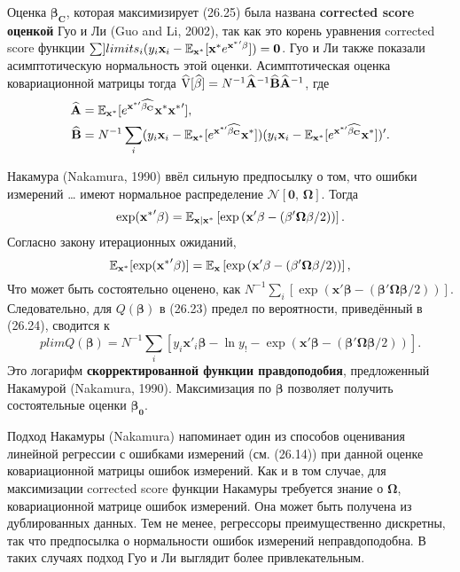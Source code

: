 Оценка $\mathbf{\beta_C}$, которая максимизирует (26.25) была названа {\bf corrected score оценкой} Гуо и Ли (Guo and Li, 2002), так как это корень уравнения corrected score функции $\sum ]limits_i (y_i \mathbf{x}_i- \mathbb{E}_{\mathbf{x^*}}[\mathbf{x^*}e^{\mathbf{x^*}'\mathbf{\beta}}])=\mathbf{0}$. Гуо и Ли также показали асимптотическую нормальность этой оценки. Асимптотическая оценка ковариационной матрицы тогда $\widehat{\mathrm{V}}[\widehat{\mathbf{\beta}}]=N^{-1} \widehat{\mathbf{A}}^{-1}\widehat{\mathbf{B}}\widehat{\mathbf{A}}^{-1}$, где 
\begin{align*}
\widehat{\mathbf{A}}&=\mathbb{E}_{\mathbf{x^*}}[e^{\mathbf{x}^{*\prime} \widehat{\mathbf{\beta_C}}} \mathbf{x^*} \mathbf{x^*}'], \\
\widehat{\mathbf{B}}&=N^{-1} \sum \limits_i (y_i \mathbf{x}_i - \mathbb{E}_{\mathbf{x^*}}[e^{\mathbf{x}^{*\prime} \widehat{\mathbf{\beta_C}}} \mathbf{x^*}]) (y_i \mathbf{x}_i - \mathbb{E}_{\mathbf{x^*}}[e^{\mathbf{x}^{*\prime} \widehat{\mathbf{\beta_C}}} \mathbf{x^*}])'.
\end{align*}

Накамура (Nakamura, 1990) ввёл сильную предпосылку о том, что ошибки измерений … имеют нормальное распределение $\mathcal{N}[\mathbf{0}, \, \mathbf{\Omega}]$. Тогда
\[
\exp (\mathbf{x^*}' \mathbf{\beta}) = \mathbb{E}_{\mathbf{x|x^*}} \left[ \exp \left(\mathbf{x}' \mathbf{\beta} - (\mathbf{\beta' \Omega \beta} /2) \right) \right].
\]
Согласно закону итерационных ожиданий,
\[
\mathbb{E}_{\mathbf{x^*}} [\exp (\mathbf{x^*}' \mathbf{\beta})] = \mathbb{E}_{\mathbf{x}} \left[ \exp \left(\mathbf{x}' \mathbf{\beta} - (\mathbf{\beta' \Omega \beta} /2) \right) \right],
\]
Что может быть состоятельно оценено, как $N^{-1} \sum \limits_i [ \exp (\mathbf{x}' \mathbf{\beta} - (\mathbf{\beta' \Omega \beta} /2) )]$. Следовательно, для $Q(\mathbf{\beta})$ в (26.23) предел по вероятности, приведённый в (26.24), сводится к
\[
plim Q(\mathbf{\beta}) = N^{-1} \sum \limits_i \left[ y_i \mathbf{x}'_i \mathbf{\beta} - \ln y_! - \exp \left(\mathbf{x}' \mathbf{\beta} - (\mathbf{\beta' \Omega \beta} /2) \right) \right].
\]
Это логарифм {\bf скорректированной функции правдоподобия}, предложенный Накамурой (Nakamura, 1990). Максимизация по $\mathbf{\beta}$ позволяет получить состоятельные оценки $\mathbf{\beta_0}$.

Подход Накамуры (Nakamura) напоминает один из способов оценивания линейной регрессии с ошибками измерений (см. (26.14)) при данной оценке ковариационной матрицы ошибок измерений. Как и в том случае, для максимизации corrected score функции Накамуры требуется знание о $\mathbf{\Omega}$, ковариационной матрице ошибок измерений. Она может быть получена из дублированных данных. Тем не менее, регрессоры преимущественно дискретны, так что предпосылка о нормальности ошибок измерений неправдоподобна. В таких случаях подход Гуо и Ли выглядит более привлекательным.

